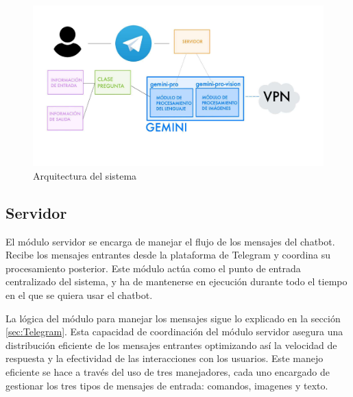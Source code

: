 \begin{figure}[h]
	\centering
	\includegraphics[width=1\textwidth]{Imagenes/arquitectura}
	\caption{Arquitectura del sistema}
	\label{fig:arquitectura}
\end{figure}

\subsection{Servidor}

El módulo servidor se encarga de manejar el flujo de los mensajes del chatbot. Recibe los mensajes entrantes desde la plataforma de Telegram y coordina su procesamiento posterior. Este módulo actúa como el punto de entrada centralizado del sistema, y ha de mantenerse en ejecución durante todo el tiempo en el que se quiera usar el chatbot.

La lógica del módulo para manejar los mensajes sigue lo explicado en la sección \ref{sec:Telegram}.  Esta capacidad de coordinación del módulo servidor asegura una distribución eficiente de los mensajes entrantes optimizando así la velocidad de respuesta y la efectividad de las interacciones con los usuarios. Este manejo eficiente se hace a través del uso de tres manejadores, cada uno encargado de gestionar los tres tipos de mensajes de entrada: comandos, imagenes y texto. 


